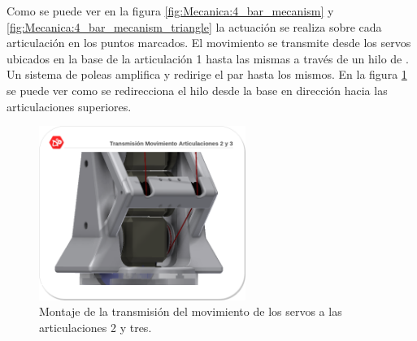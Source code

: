     Como se puede ver en la figura \ref{fig:Mecanica:4_bar_mecanism} y \ref{fig:Mecanica:4_bar_mecanism_triangle} la actuación se realiza sobre cada articulación en los puntos marcados. El movimiento se transmite desde los servos ubicados en la base de la articulación 1 hasta las mismas a través de un hilo de . Un sistema de poleas amplifica y redirige el par hasta los mismos. En la figura \ref{fig:Mecanica:transmision_poleas_cuerda} se puede ver como se redirecciona el hilo desde la base en dirección hacia las articulaciones superiores.

   	\begin{figure}[H]
   		\centering
   		\includegraphics[width=0.6\textwidth]{figuras/Imagenes_Mecanica/TransmisionMotorArticulacion.png}
   		\caption{Montaje de la transmisión del movimiento de los servos a las articulaciones 2 y tres.}
   		\label{fig:Mecanica:transmision_poleas_cuerda}
   	\end{figure}

